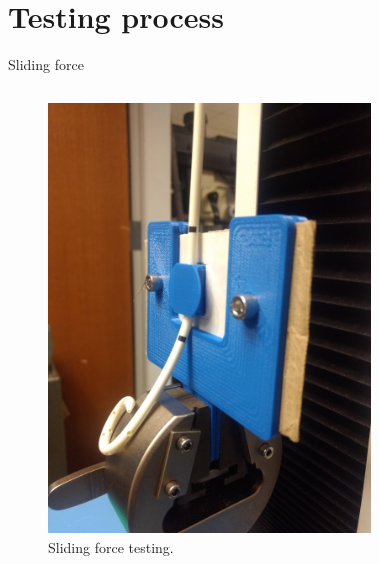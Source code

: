 \documentclass[10pt]{beamer} %
\begin{document}
\section{Testing process}

\begin{frame}[fragile]{Sliding force}
\begin{columns}[T,onlytextwidth]
	\begin{figure}
	\vspace{1cm}
	\includegraphics[scale=0.03]{test-CTHD}
	\caption{Sliding force testing.}
	\end{figure}
	\begin{figure}
	\vspace{1cm}

\end{figure}
\end{columns}
\end{frame}
\end{document}

